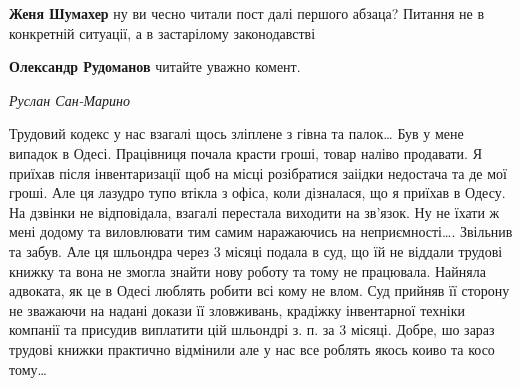 \begin{itemize}
\begin{itemize} %
\textbf{Женя Шумахер} ну ви чесно читали пост далі першого абзаца? Питання не в конкретній ситуації, а в застарілому законодавстві

\textbf{Олександр Рудоманов} читайте уважно комент.
\end{itemize} %

\emph{Руслан Сан-Марино}

Трудовий кодекс у нас взагалі щось зліплене з гівна та палок… Був у мене
випадок в Одесі. Працівниця почала красти гроші, товар наліво продавати. Я
приїхав після інвентаризації щоб на місці розібратися заіідки недостача та де
мої гроші. Але ця лазудро тупо втікла з офіса, коли дізналася, що я приїхав в
Одесу. На дзвінки не відповідала, взагалі перестала виходити на зв’язок. Ну не
їхати ж мені додому та виловлювати тим самим наражаючись на неприємності….
Звільнив та забув. Але ця шльондра через 3 місяці подала в суд, що їй не
віддали трудові книжку та вона не змогла знайти нову роботу та тому не
працювала. Найняла адвоката, як це в Одесі люблять робити всі кому не влом. Суд
прийняв її сторону не зважаючи на надані докази її зловживань, крадіжку
інвентарної техніки компанії та присудив виплатити цій шльондрі з. п. за 3
місяці.  Добре, шо зараз трудові книжки практично відмінили але у нас все
роблять якось коиво та косо тому…

\end{itemize} %
